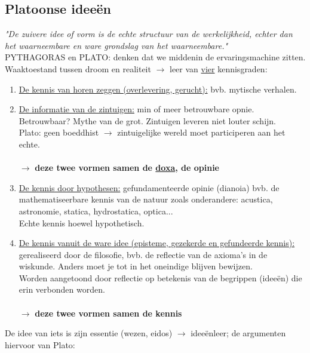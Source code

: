 \documentclass[11pt,a4paper]{article}
\begin{document}
\subsection{Platoonse idee\"en}
\textit{"De zuivere idee of vorm is de echte structuur van de werkelijkheid, echter dan het waarneembare en ware grondslag van het waarneembare."}
\\
PYTHAGORAS en PLATO: denken dat we middenin de ervaringsmachine zitten.
\\
Waaktoestand tussen droom en realiteit $\rightarrow$ leer van \underline{vier} kennisgraden:
\begin{enumerate}
\item \underline{De kennis van horen zeggen (overlevering, gerucht):} bvb. mytische verhalen.
\item \underline{De informatie van de zintuigen:} min of meer betrouwbare opnie. Betrouwbaar? Mythe van de grot.
Zintuigen leveren niet louter schijn. 
\\ Plato: geen boeddhist $\rightarrow$ zintuigelijke wereld moet participeren aan het echte.
\\
\\
$\longrightarrow$ \textbf{deze twee vormen samen de \underline{doxa}, de opinie}
\item \underline{De kennis door hypothesen:} gefundamenteerde opinie (dianoia) bvb. de mathematiseerbare kennis van de natuur zoals onderandere: acustica, astronomie, statica, hydrostatica, optica...
\\
Echte kennis hoewel hypothetisch.

\item \underline{De kennis vanuit de ware idee (episteme, gezekerde en gefundeerde kennis):}
gerealiseerd door de filosofie, bvb. de reflectie van de axioma's in de wiskunde. Anders moet je tot in het oneindige blijven bewijzen.
\\
Worden aangetoond door reflectie op betekenis van de begrippen (idee\"en) die erin verbonden worden.
\\
\\
$\longrightarrow$ \textbf{deze twee vormen samen de kennis}
\end{enumerate}
De idee van iets is zijn essentie (wezen, eidos) $\rightarrow$ idee\"enleer; de argumenten hiervoor van Plato:
\end{document}
